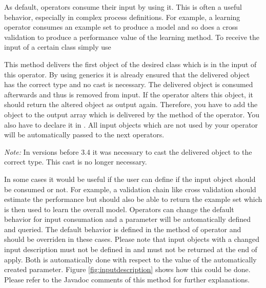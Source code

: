As default, operators consume their input by using it. This is often a
useful behavior, especially in complex process definitions. 
For example, a learning operator consumes an example set to produce a
model and so does a cross validation to produce a performance value of
the learning method. To receive the input  of a certain
class simply use
\begin{center}
\end{center}
This method delivers the first object of the desired class which is in the
input of this operator. By using generics it is already ensured that the
delivered object has the correct type and no cast is necessary. 
The delivered object is consumed afterwards
and thus is removed from input. If the operator alters this object, it
should return the altered object as output again. Therefore, you have
to add the object to the output array which is delivered by the
 method of the operator. You also have to declare it in
.
All input objects which are not used by your operator will be
automatically passed to the next operators. 

\emph{Note:} In versions before 3.4 it was necessary to cast the delivered
object to the correct type. This cast is no longer necessary.

In some cases it would be useful if the user can define if the input
object should be consumed or not. For example, a validation chain like
cross validation should estimate the performance but should also be
able to return the example set which is then used to learn the overall
model.
Operators can change the default behavior for input consumation and
a parameter will be automatically defined and queried. The default
behavior is defined in the method  
of operator and should be overriden in these cases. Please
note that input objects with a changed input description must not be
defined in  and must not be returned at the
end of apply. Both is automatically done with respect to the value of
the automatically created parameter. Figure \ref{fig:inputdescription}
shows how this could be done. Please refer to the Javadoc comments of
this method for further explanations.





